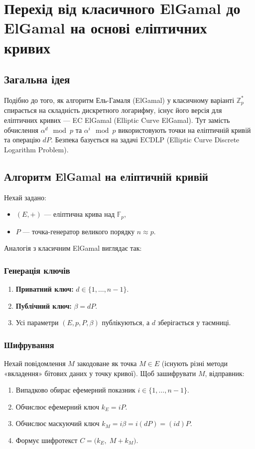 \documentclass[12pt]{report}
\theoremstyle{definition}
\theoremstyle{plain}
\begin{document}
\chapter{Перехід від класичного ElGamal до ElGamal на основі еліптичних кривих}
\label{ch:ec_elgamal}

\section{Загальна ідея}

Подібно до того, як алгоритм Ель-Гамаля (ElGamal) у класичному варіанті \(\mathbb{Z}_p^*\) спирається на складність дискретного логарифму, існує його версія для еліптичних кривих — EC ElGamal (Elliptic Curve ElGamal). Тут замість обчислення \(\alpha^d \mod p\) та \(\alpha^i \mod p\) використовують точки на еліптичній кривій та операцію \(dP\). Безпека базується на задачі \(\text{ECDLP}\) (Elliptic Curve Discrete Logarithm Problem).

\section{Алгоритм ElGamal на еліптичній кривій}

Нехай задано:
\begin{itemize}
    \item \((E, +)\) — еліптична крива над \(\mathbb{F}_p\),
    \item \(P\) — точка-генератор великого порядку \(n \approx p\).
\end{itemize}

Аналогія з класичним ElGamal виглядає так:

\subsection{Генерація ключів}
\begin{enumerate}
    \item \textbf{Приватний ключ:} \(d \in \{1,\ldots, n-1\}\).
    \item \textbf{Публічний ключ:} \(\beta = dP\).
    \item Усі параметри \((E, p, P, \beta)\) публікуються, а \(d\) зберігається у таємниці.
\end{enumerate}

\subsection{Шифрування}
Нехай повідомлення \(M\) закодоване як точка \(M \in E\) (існують різні методи «вкладення» бітових даних у точку кривої). Щоб зашифрувати \(M\), відправник:
\begin{enumerate}
    \item Випадково обирає ефемерний показник \(i \in \{1,\ldots, n-1\}\).
    \item Обчислює ефемерний ключ \(k_E = iP\).
    \item Обчислює маскуючий ключ \(k_M = i\beta = i(dP) = (id)P\).
    \item Формує шифротекст \(C = \bigl( k_E,\; M + k_M \bigr)\).
\end{enumerate}
\end{document}
